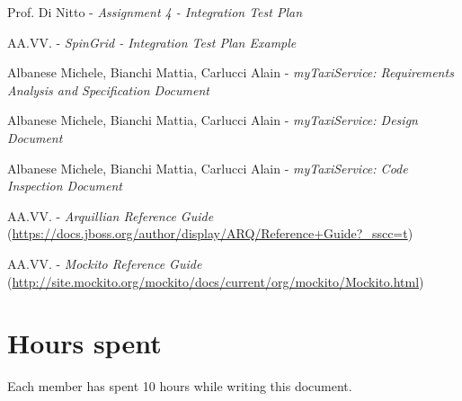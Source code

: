\documentclass[a4paper, 12pt]{article}
\begin{document}
\begin{thebibliography}{9}
    Prof. Di Nitto - \emph{Assignment 4 - Integration Test Plan}

    AA.VV. - \emph{SpinGrid - Integration Test Plan Example}

        Albanese Michele, Bianchi Mattia, Carlucci Alain - \emph{myTaxiService: Requirements Analysis and Specification Document}

        Albanese Michele, Bianchi Mattia, Carlucci Alain - \emph{myTaxiService: Design Document}

        Albanese Michele, Bianchi Mattia, Carlucci Alain - \emph{myTaxiService: Code Inspection Document}

        AA.VV. - \emph{Arquillian Reference Guide} {\small(\url{https://docs.jboss.org/author/display/ARQ/Reference+Guide?_sscc=t})}

        AA.VV. - \emph{Mockito Reference Guide} {\small(\url{http://site.mockito.org/mockito/docs/current/org/mockito/Mockito.html})}
\end{thebibliography}

\vfill

\section*{Hours spent}
Each member has spent 10 hours while writing this document.
\end{document}
